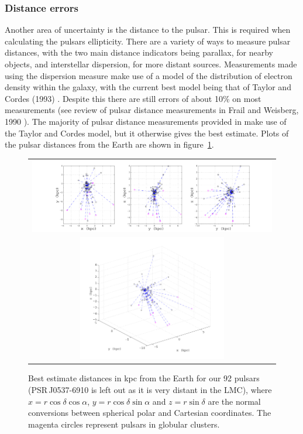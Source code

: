 \subsubsection{Distance errors}
Another area of uncertainty is the distance to the pulsar. This is required when calculating the
pulsars ellipticity. There are a variety of ways to measure pulsar distances, with the two main
distance indicators being parallax, for nearby objects, and interstellar dispersion, for more
distant sources. Measurements made using the dispersion measure make use of a model of the
distribution of electron density within the galaxy, with the current best model being that of Taylor
and Cordes (1993) \cite{TaylorCordes:1993}. Despite this there are still errors of about 10\% on
most measurements (see review of pulsar distance measurements in Frail and Weisberg, 1990
\cite{Frail:1990}). The majority of pulsar distance measurements provided in \cite{ATNF} make use of
the Taylor and Cordes model, but it otherwise gives the best estimate. Plots of the pulsar distances
from the Earth are shown in figure~\ref{PulsarDist}.
\begin{figure}[!htbp]
\caption[Best estimate distances in kpc from the Earth for 92 pulsars.]{Best estimate distances
in kpc from the Earth for our 92 pulsars \cite{ATNF} (PSR\,J0537-6910 is left out as it is very
distant in the LMC), where $x=r\cos{\delta}\cos{\alpha}$, $y = r\cos{\delta}\sin{\alpha}$ and $z =
r\sin{\delta}$ are the normal conversions between spherical polar and Cartesian coordinates. The
magenta circles represent pulsars in globular clusters.}\label{PulsarDist}
\begin{center}
\begin{tabular}{c}
\includegraphics[width=1.0\textwidth]{figs/PulsarDistCart} \\
\includegraphics[width=0.6\textwidth]{figs/PulsarDist3D}
\end{tabular}
\end{center}
\end{figure}


